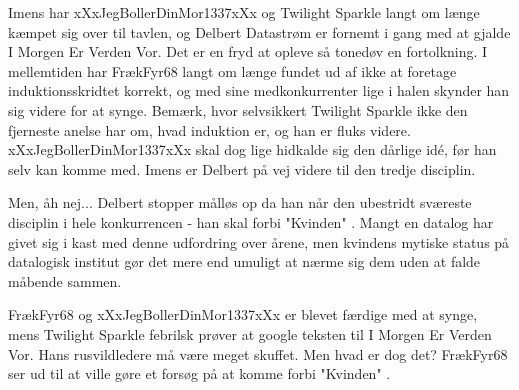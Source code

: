 \documentclass[a4paper,11pt]{article}
\begin{document}
\begin{sketch}

 Imens har xXxJegBollerDinMor1337xXx og Twilight Sparkle langt om længe kæmpet sig over til tavlen, og Delbert Datastrøm er fornemt i gang med at gjalde I Morgen Er Verden Vor. Det er en fryd at opleve så tonedøv en fortolkning. I mellemtiden har FrækFyr68 langt om længe fundet ud af ikke at foretage induktionsskridtet korrekt, og med sine medkonkurrenter lige i halen skynder han sig videre for at synge. Bemærk, hvor selvsikkert Twilight Sparkle ikke den fjerneste anelse har om, hvad induktion er, og han er fluks videre. xXxJegBollerDinMor1337xXx skal dog lige hidkalde sig den dårlige idé, før han selv kan komme med. Imens er Delbert på vej videre til den tredje disciplin.



   Men, åh nej... Delbert stopper målløs op da han når den ubestridt sværeste disciplin i hele konkurrencen - han skal forbi "Kvinden" . Mangt en datalog har givet sig i kast med denne udfordring over årene, men kvindens mytiske status på datalogisk institut gør det mere end umuligt at nærme sig dem uden at falde måbende sammen.



 FrækFyr68 og xXxJegBollerDinMor1337xXx er blevet færdige med at synge, mens Twilight Sparkle febrilsk prøver at google teksten til I Morgen Er Verden Vor. Hans rusvildledere må være meget skuffet. Men hvad er dog det? FrækFyr68 ser ud til at ville gøre et forsøg på at komme forbi "Kvinden" .


\end{sketch}
\end{document}
